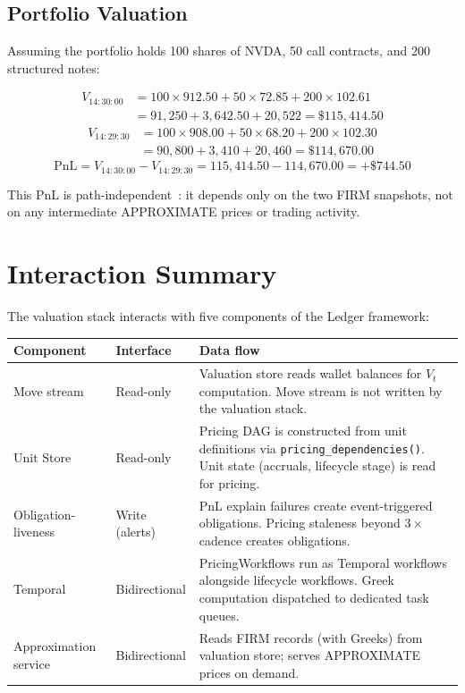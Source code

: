 \documentclass[11pt,a4paper]{article}
\begin{document}
\subsection{Portfolio Valuation}

Assuming the portfolio holds 100 shares of NVDA, 50 call contracts, and 200 structured notes:

\begin{align*}
V_{14:30:00} &= 100 \times 912.50 + 50 \times 72.85 + 200 \times 102.61 \\
&= 91{,}250 + 3{,}642.50 + 20{,}522 = \$115{,}414.50
\end{align*}
\begin{align*}
V_{14:29:30} &= 100 \times 908.00 + 50 \times 68.20 + 200 \times 102.30 \\
&= 90{,}800 + 3{,}410 + 20{,}460 = \$114{,}670.00
\end{align*}
\[
\mathrm{PnL} = V_{14:30:00} - V_{14:29:30} = 115{,}414.50 - 114{,}670.00 = +\$744.50
\]

This PnL is path-independent~\cite[\S4.3]{ledger}: it depends only on the two FIRM snapshots, not on any intermediate APPROXIMATE prices or trading activity.

\clearpage
\section{Interaction Summary}
\label{sec:interactions}

The valuation stack interacts with five components of the Ledger framework:

\begin{center}
\small
\begin{tabular}{l p{4cm} p{6.5cm}}
\toprule
\textbf{Component} & \textbf{Interface} & \textbf{Data flow} \\
\midrule
Move stream~\cite[\S8]{ledger} & Read-only & Valuation store reads wallet balances for $V_t$ computation. Move stream is not written by the valuation stack. \\
Unit Store~\cite[\S3]{ledger} & Read-only & Pricing DAG is constructed from unit definitions via \texttt{pricing\_dependencies()}. Unit state (accruals, lifecycle stage) is read for pricing. \\
Obligation-liveness~\cite[\S14.7]{ledger} & Write (alerts) & PnL explain failures create event-triggered obligations. Pricing staleness beyond $3\times$ cadence creates obligations. \\
Temporal~\cite[\S14]{ledger} & Bidirectional & PricingWorkflows run as Temporal workflows alongside lifecycle workflows. Greek computation dispatched to dedicated task queues. \\
Approximation service & Bidirectional & Reads FIRM records (with Greeks) from valuation store; serves APPROXIMATE prices on demand. \\
\bottomrule
\end{tabular}
\end{center}
\end{document}

